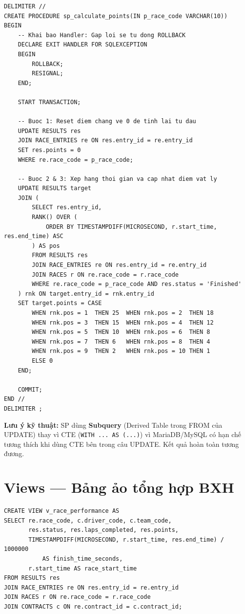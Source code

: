 \documentclass[13pt, a4paper]{report}
\begin{document}
\begin{lstlisting}[caption={Stored Procedure sp\_calculate\_points --- Tính điểm F1 tự động}]
DELIMITER //
CREATE PROCEDURE sp_calculate_points(IN p_race_code VARCHAR(10))
BEGIN
    -- Khai bao Handler: Gap loi se tu dong ROLLBACK
    DECLARE EXIT HANDLER FOR SQLEXCEPTION 
    BEGIN
        ROLLBACK;
        RESIGNAL;
    END;

    START TRANSACTION;
    
    -- Buoc 1: Reset diem chang ve 0 de tinh lai tu dau
    UPDATE RESULTS res
    JOIN RACE_ENTRIES re ON res.entry_id = re.entry_id
    SET res.points = 0
    WHERE re.race_code = p_race_code;
    
    -- Buoc 2 & 3: Xep hang thoi gian va cap nhat diem vat ly
    UPDATE RESULTS target
    JOIN (
        SELECT res.entry_id,
        RANK() OVER (
            ORDER BY TIMESTAMPDIFF(MICROSECOND, r.start_time, res.end_time) ASC
        ) AS pos
        FROM RESULTS res
        JOIN RACE_ENTRIES re ON res.entry_id = re.entry_id
        JOIN RACES r ON re.race_code = r.race_code
        WHERE re.race_code = p_race_code AND res.status = 'Finished'
    ) rnk ON target.entry_id = rnk.entry_id
    SET target.points = CASE 
        WHEN rnk.pos = 1  THEN 25  WHEN rnk.pos = 2  THEN 18
        WHEN rnk.pos = 3  THEN 15  WHEN rnk.pos = 4  THEN 12
        WHEN rnk.pos = 5  THEN 10  WHEN rnk.pos = 6  THEN 8
        WHEN rnk.pos = 7  THEN 6   WHEN rnk.pos = 8  THEN 4
        WHEN rnk.pos = 9  THEN 2   WHEN rnk.pos = 10 THEN 1
        ELSE 0 
    END;
        
    COMMIT;
END //
DELIMITER ;
\end{lstlisting}

\begin{notebox}
\textbf{Lưu ý kỹ thuật:} SP dùng \textbf{Subquery} (Derived Table trong FROM của UPDATE) thay vì CTE (\texttt{WITH ... AS (...)}) vì MariaDB/MySQL có hạn chế tương thích khi dùng CTE bên trong câu UPDATE. Kết quả hoàn toàn tương đương.
\end{notebox}

\section{Views --- Bảng ảo tổng hợp BXH}

\begin{lstlisting}[caption={View v\_race\_performance --- Nguồn dữ liệu gốc cho BXH}]
CREATE VIEW v_race_performance AS
SELECT re.race_code, c.driver_code, c.team_code,
       res.status, res.laps_completed, res.points,
       TIMESTAMPDIFF(MICROSECOND, r.start_time, res.end_time) / 1000000 
           AS finish_time_seconds,
       r.start_time AS race_start_time
FROM RESULTS res 
JOIN RACE_ENTRIES re ON res.entry_id = re.entry_id 
JOIN RACES r ON re.race_code = r.race_code 
JOIN CONTRACTS c ON re.contract_id = c.contract_id;
\end{lstlisting}
\end{document}

